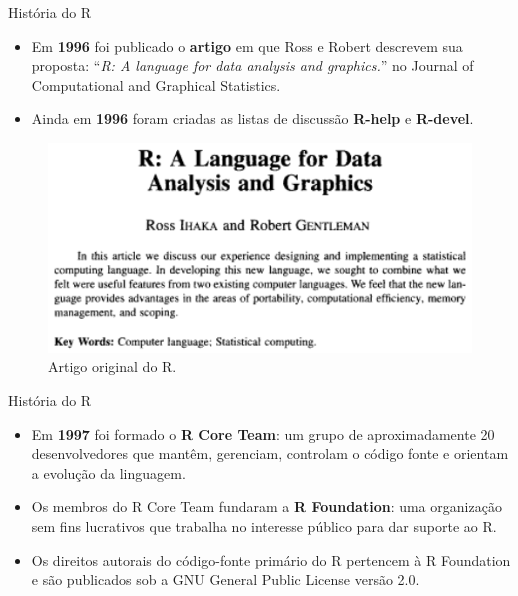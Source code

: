\documentclass[
  ignorenonframetext,
  serif,
  professionalfont,
  usenames,
  dvipsnames,
  aspectratio = 169]{beamer}
\def\beginAHalfColumn{\begin{minipage}{0.49\textwidth}}%
\def\endColumns{\end{minipage}}%
\begin{document}
\begin{frame}{História do R}
\protect\hypertarget{histuxf3ria-do-r-1}{}
\beginAHalfColumn

\begin{itemize}
\item
  Em \textbf{1996} foi publicado o \textbf{artigo} em que Ross e Robert
  descrevem sua proposta:
  ``\emph{R: A language for data analysis and graphics.}'' no Journal of
  Computational and Graphical Statistics.
\item
  Ainda em \textbf{1996} foram criadas as listas de discussão
  \textbf{R-help} e \textbf{R-devel}.
\end{itemize}

\endColumns
\beginAHalfColumn

\begin{figure}

{\centering \includegraphics[width=0.8\linewidth]{./img/r-paper} 

}

\caption{Artigo original do R.}\label{fig:unnamed-chunk-7}
\end{figure}

\endColumns
\end{frame}

\begin{frame}{História do R}
\protect\hypertarget{histuxf3ria-do-r-2}{}
\begin{itemize}
\item
  Em \textbf{1997} foi formado o \textbf{R Core Team}: um grupo de
  aproximadamente 20 desenvolvedores que mantêm, gerenciam, controlam o
  código fonte e orientam a evolução da linguagem.
\item
  Os membros do R Core Team fundaram a \textbf{R Foundation}: uma
  organização sem fins lucrativos que trabalha no interesse público para
  dar suporte ao R.
\item
  Os direitos autorais do código-fonte primário do R pertencem à R
  Foundation e são publicados sob a GNU General Public License versão
  2.0.
\end{itemize}
\end{frame}
\end{document}
